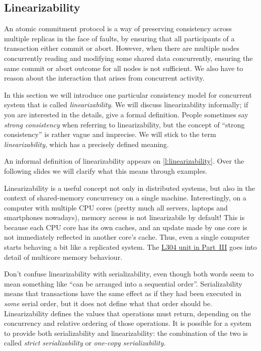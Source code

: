 \subsection{Linearizability}

An atomic commitment protocol is a way of preserving consistency across multiple replicas in the face of faults, by ensuring that all participants of a transaction either commit or abort.
However, when there are multiple nodes concurrently reading and modifying some shared data concurrently, ensuring the same commit or abort outcome for all nodes is not sufficient.
We also have to reason about the interaction that arises from concurrent activity.

In this section we will introduce one particular consistency model for concurrent system that is called \emph{linearizability}.
We will discuss linearizability informally; if you are interested in the details, \cite{Herlihy:1990} give a formal definition.
People sometimes say \emph{strong consistency} when referring to linearizability, but the concept of ``strong consistency'' is rather vague and imprecise.
We will stick to the term \emph{linearizability}, which has a precisely defined meaning.

An informal definition of linearizability appears on \autoref{l:linearizability}.
Over the following slides we will clarify what this means through examples.

Linearizability is a useful concept not only in distributed systems, but also in the context of shared-memory concurrency on a single machine.
Interestingly, on a computer with multiple CPU cores (pretty much all servers, laptops and smartphones nowadays), memory access is not linearizabile by default!
This is because each CPU core has its own caches, and an update made by one core is not immediately reflected in another core's cache.
Thus, even a single computer starts behaving a bit like a replicated system.
The \href{\multicore}{L304 unit in Part~III} goes into detail of multicore memory behaviour.

Don't confuse linearizability with serializability, even though both words seem to mean something like ``can be arranged into a sequential order''.
Serializability means that transactions have the same effect as if they had been executed in \emph{some} serial order, but it does not define what that order should be.
Linearizability defines the values that operations must return, depending on the concurrency and relative ordering of those operations.
It is possible for a system to provide both serializability and linearizability: the combination of the two is called \emph{strict serializability} or \emph{one-copy serializability}.

